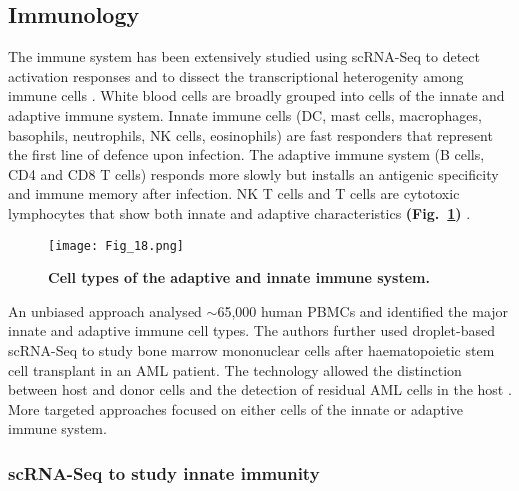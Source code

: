\subsection{Immunology}

The immune system has been extensively studied using scRNA-Seq to detect activation responses and to dissect the transcriptional heterogenity among immune cells \citep{Proserpio2015, Satija2014}. 
White blood cells are broadly grouped into cells of the innate and adaptive immune system. 
Innate immune cells (\gls{DC}, mast cells, macrophages, basophils, neutrophils, \gls{NK} cells, eosinophils) are fast responders that represent the first line of defence upon infection. 
The adaptive immune system (B cells, CD4\plus{} and CD8\plus{} T cells) responds more slowly but installs an antigenic specificity and immune memory after infection. 
\gls{NK} T cells and \textgamma{}\textdelta{} T cells are cytotoxic lymphocytes that show both innate and adaptive characteristics \textbf{(Fig.~\ref{fig0:immune_system})} \citep{Dranoff2004}. 

\begin{figure}[!h]
\centering
\texttt{[image: Fig\_18.png]}
\caption[Cell types of the adaptive and innate immune system]{\textbf{Cell types of the adaptive and innate immune system.}}
\label{fig0:immune_system}
\end{figure}

An unbiased approach analysed $\sim$65,000 human \glspl{PBMC} and identified the major innate and adaptive immune cell types. 
The authors further used droplet-based scRNA-Seq to study bone marrow mononuclear cells after haematopoietic stem cell transplant in an \gls{AML} patient. 
The technology allowed the distinction between host and donor cells and the detection of residual AML cells in the host \citep{Zheng2017}. \\

More targeted approaches focused on either cells of the innate or adaptive immune system.

\subsubsection{scRNA-Seq to study innate immunity}

